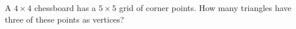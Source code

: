 A $4\times4$ chessboard has a $5\times5$ grid of corner points. How many triangles have three of these points as vertices?
